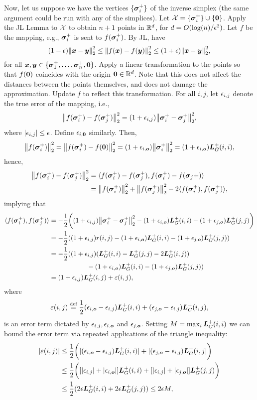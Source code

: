 Now, let us suppose we have the vertices $\{\vb*{\sigma}_i^+\}$ of the inverse simplex (the same argument could be run  with any of the simplices). Let $\mathcal{X} = \{\vb*{\sigma}_i^+\}\cup\{\vb{0}\}$. Apply the JL Lemma to $\mathcal{X}$ to  obtain $n+1$ points in $\mathbb{R}^d$, for $d=O(\log(n)/\epsilon^2)$. Let $f$ be the mapping, e.g., $\vb*{\sigma}_i^+$ is sent to $f(\vb*{\sigma}_i^+)$. By JL, have 
\[(1-\epsilon)\norm{\vb*{x}-\vb*{y}}_2^2\leq  \norm{f(\vb*{x}) -f(\vb*{y})}_2^2\leq (1+\epsilon)\norm{\vb*{x}-\vb*{y}}_2^2, \]
for all $\vb*{x},\vb*{y}\in \{\vb*{\sigma}_1^+,\dots,\vb*{\sigma}_n^+,\vb{0}\}$. 
Apply a linear transformation to the points so that $f(\vb{0})$ coincides with the origin $\vb{0}\in\mathbb{R}^d$. Note that this does not affect the distances between the points themselves, and does not damage the approximation. Update $f$ to reflect this transformation. 
For all $i,j$, let $\epsilon_{i,j}$ denote the true error of the mapping, i.e., 
\[\norm{f(\vb*{\sigma}_i^+)-f(\vb*{\sigma}_j^+)}_2^2 = (1+\epsilon_{i,j})\norm{\vb*{\sigma}_i^+-\vb*{\sigma}_j^+}_2^2,\]
where $|\epsilon_{i,j}|\leq \epsilon$. Define $\epsilon_{i,\vb{0}}$ similarly. 
Then, 
\[\norm{f(\vb*{\sigma}_i^+)}_2^2 = \norm{f(\vb*{\sigma}_i^+)-f(\vb{0})}_2^2 = (1+\epsilon_{i,\vb*{o}})\norm{\vb*{\sigma}_i^+}_2^2 = (1+\epsilon_{i,\vb*{o}})\vb*{L}_G^+(i,i),\]
hence, 
\begin{align*}
\norm{f(\vb*{\sigma}_i^+)-f(\vb*{\sigma}_j^+)}_2^2 &= \langle f(\vb*{\sigma}_i^+)-f(\vb*{\sigma}_j^+),f(\vb*{\sigma}_i^+)-f(\vb*{\sigma}_j+)\rangle \\
&= \norm{f(\vb*{\sigma}_i^+)}_2^2 + \norm{f(\vb*{\sigma}_j^+)}_2^2 - 2\langle f(\vb*{\sigma}_i^+),f(\vb*{\sigma}_j^+)\rangle,  
\end{align*}
implying that 
\begin{align*}
\langle f(\vb*{\sigma}_i^+),f(\vb*{\sigma}_j^+) \rangle &= -\frac{1}{2} \bigg((1+\epsilon_{i,j})\norm{\vb*{\sigma}_i^+-\vb*{\sigma}_j^+}_2^2 - (1+\epsilon_{i,\vb*{o}})\vb*{L}_G^+(i,i) - (1+\epsilon_{j,\vb*{o}})\vb*{L}_G^+(j,j)\bigg) \\
&= -\frac{1}{2}((1+\epsilon_{i,j})r(i,j) - (1+\epsilon_{i,\vb*{o}})\vb*{L}_G^+(i,i) - (1+\epsilon_{j,\vb*{o}})\vb*{L}_G^+(j,j)) \\
&= -\frac{1}{2}((1+\epsilon_{i,j})(\vb*{L}_G^+(i,i) - \vb*{L}_G^+(j,j) - 2\vb*{L}_G^+(i,j)) \\
&\hspace{2cm}- (1+\epsilon_{i,\vb*{o}})\vb*{L}_G^+(i,i) - (1+\epsilon_{j,\vb*{o}})\vb*{L}_G^+(j,j))\\
&= (1+\epsilon_{i,j})\vb*{L}_G^+(i,j) + \varepsilon(i,j),
\end{align*}
where 
\[\varepsilon(i,j)\overset{\text{def}}{=} \frac{1}{2}(\epsilon_{i,\vb*{o}}-\epsilon_{i,j})\vb*{L}_G^+(i,i) + (\epsilon_{j,\vb*{o}}-\epsilon_{i,j})\vb*{L}_G^+(i,j),\]
is an error term dictated by $\epsilon_{i,j}, \epsilon_{i,\vb*{o}}$ and $\epsilon_{j,\vb*{o}}$. Setting $M= \max_i \vb*{L}_G^+(i,i)$ 
we can bound the error term via repeated applications of the triangle inequality: 
\begin{align*}
|\varepsilon(i,j)|& \leq \frac{1}{2}\bigg(|(\epsilon_{i,\vb*{o}}-\epsilon_{i,j})\vb*{L}_G^+(i,i)| + |(\epsilon_{j,\vb*{o}}-\epsilon_{i,j})\vb*{L}_G^+(i,j|\bigg) \\
& \leq \frac{1}{2}\bigg([|\epsilon_{i,j}|+|\epsilon_{i,\vb*{o}}|]\vb*{L}_G^+(i,i) + [|\epsilon_{i,j}|+|\epsilon_{j,\vb*{o}}|]\vb*{L}_G^+(j,j)\bigg) \\
&\leq \frac{1}{2} ( 2\epsilon\vb*{L}_G^+(i,i) + 2\epsilon\vb*{L}_G^+(j,j) ) \leq 2\epsilon M,
\end{align*}
